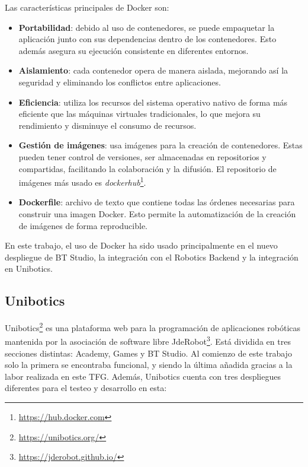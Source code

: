 Las características principales de Docker son:

\begin{itemize}
    \item \textbf{Portabilidad}: debido al uso de contenedores, se puede empaquetar la aplicación junto con sus dependencias dentro de los contenedores. Esto además asegura su ejecución consistente en diferentes entornos.
    
    \item \textbf{Aislamiento}: cada contenedor opera de manera aislada, mejorando así la seguridad y eliminando los conflictos entre aplicaciones.
    
    \item \textbf{Eficiencia}: utiliza los recursos del sistema operativo nativo de forma más eficiente que las máquinas virtuales tradicionales, lo que mejora su rendimiento y disminuye el consumo de recursos.
    
    \item \textbf{Gestión de imágenes}: usa imágenes para la creación de contenedores. Estas pueden tener control de versiones, ser almacenadas en repositorios y compartidas, facilitando la colaboración y la difusión. El repositorio de imágenes más usado es \textit{dockerhub}\footnote{\url{https://hub.docker.com}}.
    
    \item \textbf{Dockerfile}: archivo de texto que contiene todas las órdenes necesarias para construir una imagen Docker. Esto permite la automatización de la creación de imágenes de forma reproducible.
    
\end{itemize}

En este trabajo, el uso de Docker ha sido usado principalmente en el nuevo despliegue de BT Studio, la integración con el Robotics Backend y la integración en Unibotics.

\subsection{Unibotics}\label{sec:unibotics}

Unibotics\footnote{\url{https://unibotics.org/}} es una plataforma web para la programación de aplicaciones robóticas\cite{RoldanAlvarez2023} mantenida por la asociación de software libre JdeRobot\footnote{\url{https://jderobot.github.io/}}. Está dividida en tres secciones distintas: Academy, Games y BT Studio. Al comienzo de este trabajo solo la primera se encontraba funcional, y siendo la última añadida gracias a la labor realizada en este TFG. Además, Unibotics cuenta con tres despliegues diferentes para el testeo y desarrollo en esta:

